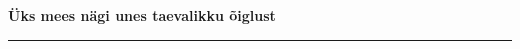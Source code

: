 \documentclass[10pt]{book}
\begin{document}
{
  \samepage
  \raggedbottom
  \raggedright
  \sloppy


  \vspace{0.2in}

  \noindent\begin{minipage}{.1\textwidth}
    \hfill\vspace{0.1in}
  \end{minipage}%
  \noindent\begin{minipage}{.8\textwidth}
    \centering
    \bfseries
    \large \"Uks mees n\"agi unes taevalikku \~oiglust
  \end{minipage}%
  \noindent\begin{minipage}{.1\textwidth}
      \hfill\vspace{0.1in}
  \end{minipage}

  \nopagebreak[4]
  \vspace{0.1in}
  \nopagebreak[4]
  \hrule height 0.05ex
  \nopagebreak[4]
  \vspace{-0.05in}




}
\end{document}
